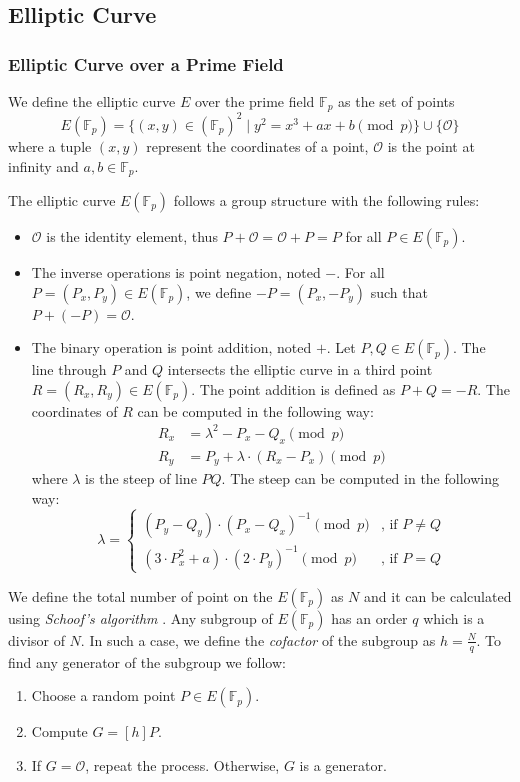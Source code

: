 \subsection{Elliptic Curve}


\subsubsection{Elliptic Curve over a Prime Field} \label{app: elliptic curve over a prime field}
We define the elliptic curve $E$ over the prime field $\mathbb{F}_p$ as the set of points
\[ E(\mathbb{F}_p) = \{(x, y) \in (\mathbb{F}_p)^2 \mid y^2 = x^3 + ax + b \pmod p \} \cup \{ \mathcal{O} \} \]
where a tuple $(x, y)$ represent the coordinates of a point, $\mathcal{O}$ is the point at infinity and $a, b \in \mathbb{F}_p$.

The elliptic curve $E(\mathbb{F}_p)$ follows a group structure with the following rules:
\begin{itemize}
    \item $\mathcal{O}$ is the identity element, thus $P + \mathcal{O} = \mathcal{O} + P = P$ for all $P \in E(\mathbb{F}_p)$.
    \item The inverse operations is point negation, noted $-$. For all $P = (P_x, P_y) \in E(\mathbb{F}_p)$, we define $-P = (P_x, -P_y)$ such that $P + (- P) = \mathcal{O}$.
    \item The binary operation is point addition, noted $+$. Let $P, Q \in E(\mathbb{F}_p)$. The line through $P$ and $Q$ intersects the elliptic curve in a third point $R = (R_x, R_y) \in E(\mathbb{F}_p)$. The point addition is defined as $P + Q = -R$. The coordinates of $R$ can be computed in the following way:
    \begin{align*}
        R_x & = \lambda^2 - P_x - Q_x \pmod p \\
        R_y & = P_y + \lambda \cdot (R_x - P_x) \pmod p 
    \end{align*}
    where $\lambda$ is the steep of line $PQ$. The steep can be computed in the following way:
    \[ \lambda = 
    \begin{cases}
        (P_y - Q_y) \cdot (P_x - Q_x)^{-1} \pmod p  & \text{, if } P \neq Q \\
        (3 \cdot P_x^2 + a) \cdot (2 \cdot P_y)^{-1} \pmod{p} & \text{, if } P = Q
    \end{cases}
    \]
\end{itemize}

We define the total number of point on the $E(\mathbb{F}_p)$ as $N$ and it can be calculated using \textit{Schoof's algorithm} \cite{Schoof85}. Any subgroup of $E(\mathbb{F}_p)$ has an order $q$ which is a divisor of $N$. In such a case, we define the \textit{cofactor} of the subgroup as $h = \frac{N}{q}$. To find any generator of the subgroup we follow:
\begin{enumerate}
    \item Choose a random point $P \in E(\mathbb{F}_p)$.
    \item Compute $G = [h]P$.
    \item If $G = \mathcal{O}$, repeat the process. Otherwise, $G$ is a generator.
\end{enumerate}

